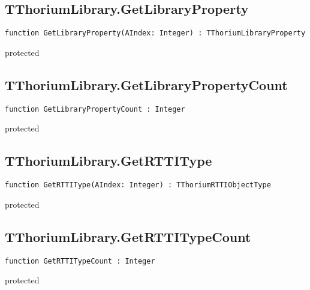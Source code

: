 \subsection{TThoriumLibrary.GetLibraryProperty}
\label{thoriumcorepkg:thorium:tthoriumlibrary:getlibraryproperty}
\begin{FPCList}
\Declaration 

\begin{verbatim}
function GetLibraryProperty(AIndex: Integer) : TThoriumLibraryProperty
\end{verbatim}
\Visibility
protected
\end{FPCList}
\subsection{TThoriumLibrary.GetLibraryPropertyCount}
\label{thoriumcorepkg:thorium:tthoriumlibrary:getlibrarypropertycount}
\begin{FPCList}
\Declaration 

\begin{verbatim}
function GetLibraryPropertyCount : Integer
\end{verbatim}
\Visibility
protected
\end{FPCList}
\subsection{TThoriumLibrary.GetRTTIType}
\label{thoriumcorepkg:thorium:tthoriumlibrary:getrttitype}
\begin{FPCList}
\Declaration 

\begin{verbatim}
function GetRTTIType(AIndex: Integer) : TThoriumRTTIObjectType
\end{verbatim}
\Visibility
protected
\end{FPCList}
\subsection{TThoriumLibrary.GetRTTITypeCount}
\label{thoriumcorepkg:thorium:tthoriumlibrary:getrttitypecount}
\begin{FPCList}
\Declaration 

\begin{verbatim}
function GetRTTITypeCount : Integer
\end{verbatim}
\Visibility
protected
\end{FPCList}
